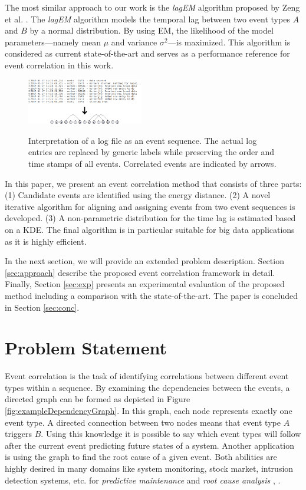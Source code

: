 \documentclass[conference]{IEEEtran}
\theoremstyle{examplestyle}
\begin{document}
The most similar approach to our work is the \textit{lagEM} algorithm proposed by Zeng et al. \cite{Zeng2015}. The \textit{lagEM} algorithm models the temporal lag between two event types \(A\) and \(B\) by a normal distribution. By using \ac{EM}, the likelihood of the model parameters---namely mean \(\mu\) and variance \(\sigma^2\)---is maximized. This algorithm is considered as current state-of-the-art and serves as a performance reference for event correlation in this work.

\begin{figure}[!tb]
	\centering
	{
	\includegraphics[width=0.45\textwidth]{images/overview.png}}
	\caption{Interpretation of a log file as an event sequence. The actual log entries are replaced by generic labels while preserving the order and time stamps of all events. Correlated events are indicated by arrows.}
	\label{fig:logToSequence}
\end{figure}

In this paper, we present an event correlation method that consists of three parts:
(1) Candidate events are identified using the energy distance. (2) A novel iterative algorithm for aligning and assigning events from two event sequences is developed. (3) A non-parametric distribution for the time lag is estimated based on a \ac{KDE}.
The final algorithm is in particular suitable for big data applications as it is highly efficient. 

In the next section, we will provide an extended problem description.
Section \ref{sec:approach} describe the proposed event correlation framework in detail.
Finally, Section \ref{sec:exp} presents an experimental evaluation of the proposed method including a comparison with the state-of-the-art.
The paper is concluded in Section \ref{sec:conc}.


\section{Problem Statement}
Event correlation is the task of identifying correlations between different event types within a sequence. By examining the dependencies between the events, a directed graph can be formed as depicted in Figure \ref{fig:exampleDependencyGraph}. In this graph, each node represents exactly one event type. A directed connection between two nodes means that event type \(A\) triggers \(B\). Using this knowledge it is possible to say which event types will follow after the current event predicting future states of a system. Another application is using the graph to find the root cause of a given event. Both abilities are highly desired in many domains like system monitoring, stock market, intrusion detection systems, etc. for \textit{predictive maintenance} and \textit{root cause analysis} \cite{Zeng2015}, \cite{Benferhat2008}.
\end{document}
